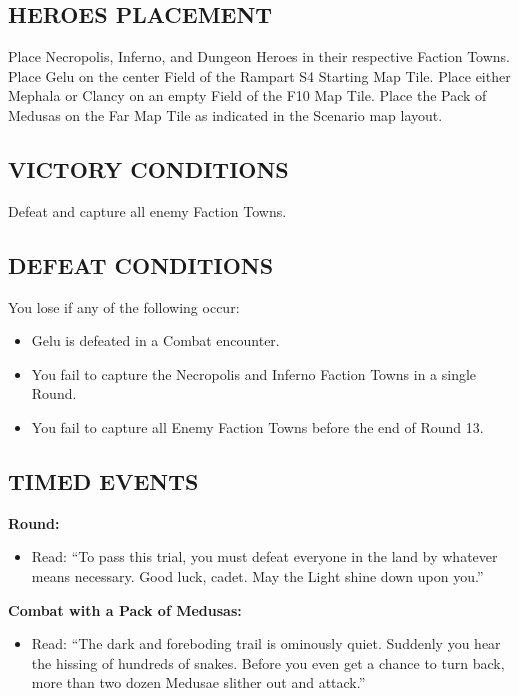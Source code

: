 \begin{multicols*}{2}
\subsection*{\MakeUppercase{Heroes Placement}}

Place Necropolis, Inferno, and Dungeon Heroes in their respective Faction Towns.
Place Gelu on the center Field of the Rampart S4 Starting Map Tile.
Place either Mephala or Clancy on an empty Field of the F10 Map Tile.
Place the Pack of Medusas on the Far Map Tile as indicated in the Scenario map layout.

\subsection*{\MakeUppercase{Victory Conditions}}

Defeat and capture all enemy Faction Towns.

\subsection*{\MakeUppercase{Defeat Conditions}}

You lose if any of the following occur:
\begin{itemize}
  \item Gelu is defeated in a Combat encounter.
  \item You fail to capture the Necropolis and Inferno Faction Towns in a single Round.
  \item You fail to capture all Enemy Faction Towns before the end of Round 13.
\end{itemize}
\subsection*{\MakeUppercase{Timed Events}}

\textbf{ Round:}
\begin{itemize}
  \item Read: ``To pass this trial, you must defeat everyone in the land by whatever means necessary.
    Good luck, cadet.
    May the Light shine down upon you.''
  \end{itemize}

\textbf{Combat with a Pack of Medusas:}
\begin{itemize}
  \item Read: ``The dark and foreboding trail is ominously quiet.
    Suddenly you hear the hissing of hundreds of snakes.
    Before you even get a chance to turn back, more than two dozen Medusae slither out and attack.''
\end{itemize}


\end{multicols*}
